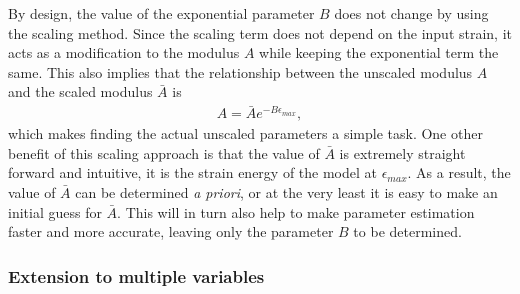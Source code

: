     By design, the value of the exponential parameter $B$ does not change by using the scaling method. Since the scaling term does not depend on the input strain, it acts as a modification to the modulus $A$ while keeping the exponential term the same. This also implies that the relationship between the unscaled modulus $A$ and the scaled modulus $\bar{A}$ is
\begin{equation}
\begin{aligned}
A = \bar{A} e^{-B\epsilon_{max}},
\end{aligned}
\end{equation}
which makes finding the actual unscaled parameters a simple task. One other benefit of this scaling approach is that the value of $\bar{A}$ is extremely straight forward and intuitive, it is the strain energy of the model at $\epsilon_{max}$. As a result, the value of $\bar{A}$ can be determined \textit{a priori}, or at the very least it is easy to make an initial guess for $\bar{A}$. This will in turn also help to make parameter estimation faster and more accurate, leaving only the parameter $B$ to be determined. 


\subsubsection{Extension to multiple variables}

